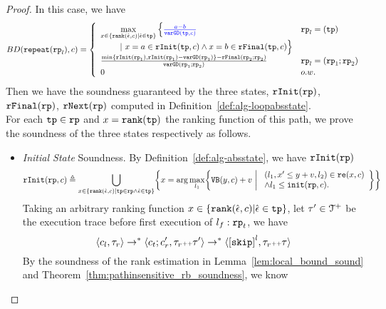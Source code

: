 \begin{proof}
In this case, we have
\[
  BD(\rprepeat(\rprog_l), c) =
  \left\{ 
  \begin{array}{lll}
    \max\limits_{x \in \left\{ \locbound(\absevent, c) | \absevent \in \tpath \right\}}
    \Big\{ \highlight{\frac{a - b}{\varGD(\tpath, c)}}  &  \rprog_l = (\tpath)
    \\ \qquad 
    ~\vert~
    x = a \in \rfinit(\tpath, c)
    \land x = b \in \rffinal(\tpath, c)
    \Big\} 
    \\
    \frac{\min\{ \rfinit(\rprog_1), \rfinit(\rprog_1) - \varGD(\rprog_1) \} - \rffinal(\rprog_2;\rprog_2)}{ 
    \varGD(\rprog_1;\rprog_2)}  & \rprog_l = (\rprog_1;\rprog_2)
    \\
    0  &  o.w.
\end{array}
\right.
\]
Then we have the soundness guaranteed by the three states,
$\mathtt{rInit}(\mathtt{rp})$, $\mathtt{rFinal}(\mathtt{rp})$, $\mathtt{rNext}(\mathtt{rp})$ computed in Definition~\ref{def:alg-loopabsstate}.
\\
For each $\mathtt{tp} \in \mathtt{rp}$ and $x = \mathtt{rank}(\mathtt{tp})$ the ranking function of this path, we prove the soundness of the three states respectively as follows.
\begin{itemize}
 \item \emph{Initial State} Soundness.
 By Definition~\ref{def:alg-absstate}, we have $\mathtt{rInit}(\mathtt{rp})$ 
 \[
  \rfinit(\rprog, c) \triangleq 
  \bigcup_{x \in \left\{ \locbound(\absevent, c) | \tpath \in \rprog \land \absevent \in \tpath \right\} }
  \left \{ 
  x = \arg\max_{l_1}\left\{
    \varinvar(y, c) + v ~\middle\vert~ 
    \begin{array}{l} 
      (l_1, x' \leq y + v, l_2) \in \reset(x, c) 
      \\
    \land l_1 \leq \absinit(\rprog, c).
  \end{array}
  \right\}
  \right\}
 \]
 Taking an arbitrary ranking function $x \in \left\{ \locbound(\absevent, c) | \absevent \in \tpath \right\}$,
 let $\mathtt{\tau}' \in \mathcal{T}^{+}$ be the execution trace before first execution of $l_f: \mathtt{rp}_t$, we have
\[
 \config{c_l, \trace_r} \to^* \config{c_t;c_r', \trace_r \tracecat \trace'} \to^* \config{\clabel{\eskip}^{l}, \trace_r \tracecat \trace}
\]
 By the soundness of the rank estimation in Lemma~\ref{lem:local_bound_sound} and Theorem~\ref{thm:pathinsensitive_rb_soundness}, we know 

\end{itemize}
\end{proof}
